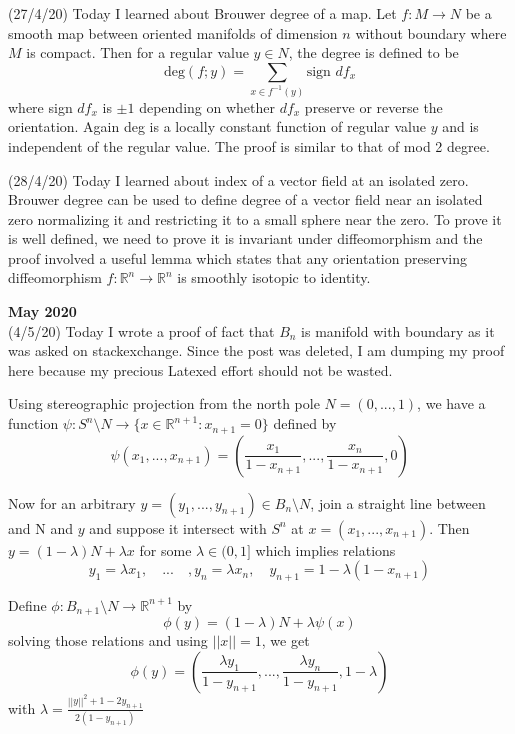 \documentclass[12pt,a4paper]{article}
\begin{document}
(27/4/20) Today I learned about Brouwer degree of a map. Let $f:M \to N$ be a smooth map between oriented manifolds of dimension $n$ without boundary where $M$ is compact. Then for a regular value $y\in N$, the degree is defined to be $$\text{deg}(f;y)= \sum_{x \in f^{-1}(y)} \text{sign }df_x$$
where sign $df_x$ is $\pm 1$ depending on whether $df_x$ preserve or reverse the orientation. Again deg is a locally constant function of regular value $y$ and is independent of the regular value. The proof is similar to that of mod 2 degree.

(28/4/20) Today I learned about index of a vector field at an isolated zero. Brouwer degree can be used to define degree of a vector field near an isolated zero normalizing it and restricting it to a small sphere near the zero. To prove it is well defined, we need to prove it is invariant under diffeomorphism and the proof involved a useful lemma which states that any orientation preserving diffeomorphism $f: \mathbb{R}^n \to \mathbb{R}^n$ is smoothly isotopic to identity. 
\\

\maketitle\textbf{May 2020}
\\

(4/5/20) Today I wrote a proof of fact that $B_n$ is manifold with boundary as it was asked on stackexchange. Since the post was deleted, I am dumping my proof here because my precious Latexed effort should not be wasted.

Using stereographic projection from the north pole $N=(0,...,1)$, we have a function $\psi :S^n\setminus N \to \{x \in \mathbb{R}^{n+1} : x_{n+1}=0\}$ defined by $$\psi (x_1,...,x_{n+1}) = \left( \frac{x_1}{1-x_{n+1}},...,\frac{x_n}{1-x_{n+1}},0\right) $$

Now for an arbitrary $y = (y_1,...,y_{n+1})\in B_n\setminus N $, join a straight line between and N and $y$ and suppose it intersect with $S^n$ at $x = (x_1,...,x_{n+1})$.
Then $y = (1-\lambda) N+ \lambda x$ for some $\lambda \in (0,1]$ which implies relations $$y_1=\lambda x_1,\quad ...\quad ,y_n = \lambda x_n, \quad y_{n+1}= 1- \lambda (1-x_{n+1})$$

Define $\phi : B_{n+1}\setminus N \to \mathbb{R}^{n+1}$ by $$\phi (y) = (1-\lambda) N+ \lambda \psi(x)$$ solving those relations and using $||x|| = 1$, we get 
$$\phi(y) = \left( \frac{\lambda y_1}{1-y_{n+1}},...,\frac{\lambda y_n}{1-y_{n+1}}, 1- \lambda\right) $$  with $\lambda = \frac{||y||^2 +1 -2y_{n+1}}{2(1-y_{n+1})}$
\end{document}
